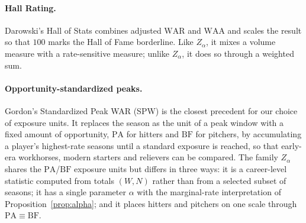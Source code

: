 \documentclass[11pt,letterpaper]{article}
\theoremstyle{plain}
\theoremstyle{definition}
\theoremstyle{remark}
\newcommand{\WAR}{\mathrm{WAR}}
\newcommand{\WAA}{\mathrm{WAA}}
\newcommand{\PA}{\mathrm{PA}}
\newcommand{\BF}{\mathrm{BF}}
\begin{document}
\paragraph{Hall Rating.} Darowski's Hall of Stats \cite{hallofstats} combines adjusted $\WAR$ and $\WAA$ and scales the result so that $100$ marks the Hall of Fame borderline. Like $Z_\alpha$, it mixes a volume measure with a rate-sensitive measure; unlike $Z_\alpha$, it does so through a weighted sum.

\paragraph{Opportunity-standardized peaks.} Gordon's Standardized Peak WAR (SPW) \cite{gordon2023} is the closest precedent for our choice of exposure units. It replaces the season as the unit of a peak window with a fixed amount of opportunity, $\PA$ for hitters and $\BF$ for pitchers, by accumulating a player's highest-rate seasons until a standard exposure is reached, so that early-era workhorses, modern starters and relievers can be compared. The family $Z_\alpha$ shares the $\PA$/$\BF$ exposure units but differs in three ways: it is a career-level statistic computed from totals $(W, N)$ rather than from a selected subset of seasons; it has a single parameter $\alpha$ with the marginal-rate interpretation of Proposition~\ref{prop:alpha}; and it places hitters and pitchers on one scale through $\PA \equiv \BF$.
\end{document}
